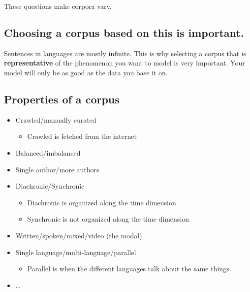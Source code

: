 \documentclass[
  11pt,
  british,
]{article}
\providecommand{\tightlist}{%
  \setlength{\itemsep}{0pt}\setlength{\parskip}{0pt}}
\begin{document}
These questions make corpora vary.

\hypertarget{choosing-a-corpus-based-on-this-is-important.}{%
\subsection{Choosing a corpus based on this is
important.}\label{choosing-a-corpus-based-on-this-is-important.}}

Sentences in languages are mostly infinite. This is why selecting a
corpus that is \textbf{representative} of the phenomenon you want to
model is very important. Your model will only be as good as the data you
base it on.

\hypertarget{properties-of-a-corpus}{%
\subsection{Properties of a corpus}\label{properties-of-a-corpus}}

\begin{itemize}
\tightlist
\item
  Crawled/manually curated

  \begin{itemize}
  \tightlist
  \item
    Crawled is fetched from the internet
  \end{itemize}
\item
  Balanced/imbalanced
\item
  Single author/more authors
\item
  Diachronic/Synchronic

  \begin{itemize}
  \tightlist
  \item
    Diachronic is organized along the time dimension
  \item
    Synchronic is not organized along the time dimension
  \end{itemize}
\item
  Written/spoken/mixed/video (the modal)
\item
  Single language/multi-language/parallel

  \begin{itemize}
  \tightlist
  \item
    Parallel is when the different languages talk about the same things.
  \end{itemize}
\item
  \ldots{}
\end{itemize}
\end{document}

